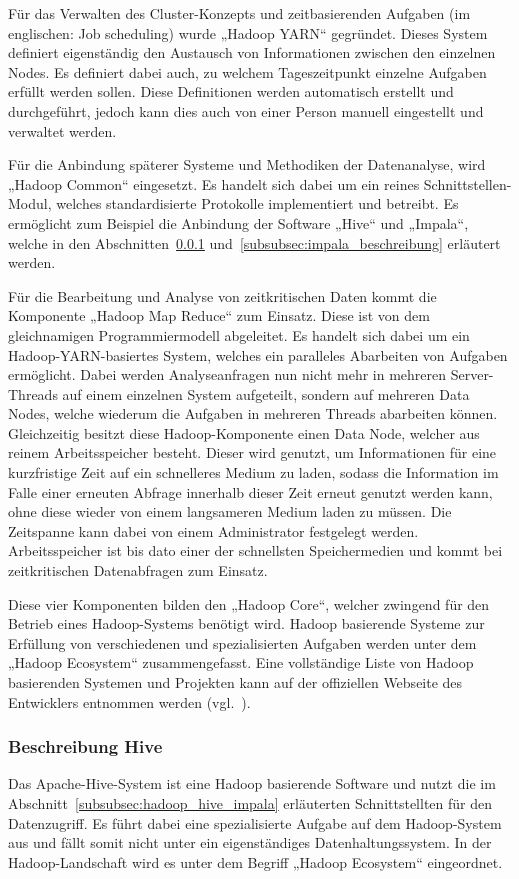 {Für das Verwalten des Cluster\hyp{}Konzepts und zeitbasierenden Aufgaben (im
englischen: Job scheduling) wurde „Hadoop YARN“ gegründet. Dieses System
definiert eigenständig den Austausch von Informationen zwischen den einzelnen
Nodes. Es definiert dabei auch, zu welchem Tageszeitpunkt einzelne Aufgaben
erfüllt werden sollen. Diese Definitionen werden automatisch erstellt und
durchgeführt, jedoch kann dies auch von einer Person manuell eingestellt und
verwaltet werden.

Für die Anbindung späterer Systeme und Methodiken der Datenanalyse, wird
„Hadoop Common“ eingesetzt. Es handelt sich dabei um ein reines
Schnittstellen\hyp{}Modul, welches standardisierte Protokolle implementiert und
betreibt. Es ermöglicht zum Beispiel die Anbindung der Software „Hive“ und
„Impala“, welche in den Abschnitten~\ref{subsubsec:hadoop_beschreibung}
und~\ref{subsubsec:impala_beschreibung} erläutert werden.

Für die Bearbeitung und Analyse von zeitkritischen Daten kommt die Komponente
„Hadoop Map Reduce“ zum Einsatz. Diese ist von dem gleichnamigen
Programmiermodell abgeleitet. Es handelt sich dabei um ein
Hadoop\hyp{}YARN\hyp{}basiertes System, welches ein paralleles Abarbeiten von
Aufgaben ermöglicht.  Dabei werden Analyseanfragen nun nicht mehr in mehreren
Server\hyp{}Threads auf einem einzelnen System aufgeteilt, sondern auf mehreren
Data Nodes, welche wiederum die Aufgaben in mehreren Threads abarbeiten können.
Gleichzeitig besitzt diese Hadoop\hyp{}Komponente einen Data Node, welcher aus
reinem Arbeitsspeicher besteht. Dieser wird genutzt, um Informationen für eine
kurzfristige Zeit auf ein schnelleres Medium zu laden, sodass die Information
im Falle einer erneuten Abfrage innerhalb dieser Zeit erneut genutzt werden
kann, ohne diese wieder von einem langsameren Medium laden zu müssen. Die
Zeitspanne kann dabei von einem Administrator festgelegt werden.
Arbeitsspeicher ist bis dato einer der schnellsten Speichermedien und kommt bei
zeitkritischen Datenabfragen zum Einsatz.

Diese vier Komponenten bilden den „Hadoop Core“, welcher zwingend für den
Betrieb eines Hadoop\hyp{}Systems benötigt wird. Hadoop basierende Systeme zur
Erfüllung von verschiedenen und spezialisierten Aufgaben werden unter dem
„Hadoop Ecosystem“ zusammengefasst. Eine vollständige Liste von Hadoop
basierenden Systemen und Projekten kann auf der offiziellen Webseite des
Entwicklers entnommen werden (vgl.~\cite{Hadoop_related_projects}).
\nl%

\subsubsection{Beschreibung Hive}
\label{subsubsec:hadoop_beschreibung}
Das Apache\hyp{}Hive\hyp{}System ist eine Hadoop basierende Software und nutzt
die im Abschnitt~\ref{subsubsec:hadoop_hive_impala} erläuterten Schnittstellten
für den Datenzugriff. Es führt dabei eine spezialisierte Aufgabe auf dem
Hadoop\hyp{}System aus und fällt somit nicht unter ein eigenständiges
Datenhaltungssystem. In der Hadoop\hyp{}Landschaft wird es unter dem Begriff
„Hadoop Ecosystem“ eingeordnet.

}
